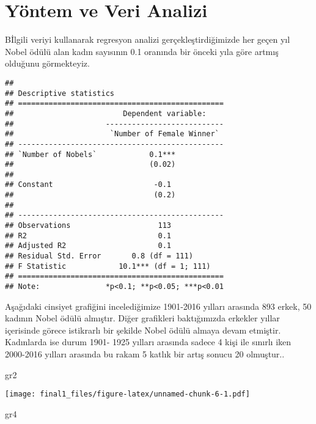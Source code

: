 \documentclass[
  12pt,
]{article}
\newenvironment{Shaded}{\begin{snugshade}}{\end{snugshade}}
\newcommand{\NormalTok}[1]{#1}
\begin{document}
\hypertarget{yuxf6ntem-ve-veri-analizi}{%
\section{Yöntem ve Veri Analizi}\label{yuxf6ntem-ve-veri-analizi}}

Bİlgili veriyi kullanarak regresyon analizi gerçekleştirdiğimizde her geçen yıl Nobel ödülü alan kadın sayısının 0.1 oranında bir önceki yıla göre artmış olduğunu görmekteyiz.

\begin{verbatim}
## 
## Descriptive statistics
## ===============================================
##                         Dependent variable:    
##                     ---------------------------
##                      `Number of Female Winner` 
## -----------------------------------------------
## `Number of Nobels`            0.1***           
##                               (0.02)           
##                                                
## Constant                       -0.1            
##                                (0.2)           
##                                                
## -----------------------------------------------
## Observations                    113            
## R2                              0.1            
## Adjusted R2                     0.1            
## Residual Std. Error       0.8 (df = 111)       
## F Statistic            10.1*** (df = 1; 111)   
## ===============================================
## Note:               *p<0.1; **p<0.05; ***p<0.01
\end{verbatim}

Aşağıdaki cinsiyet grafiğini incelediğimize 1901-2016 yılları arasında 893 erkek, 50 kadının Nobel ödülü almıştır.
Diğer grafikleri baktığımızda erkekler yıllar içerisinde görece istikrarlı bir şekilde Nobel ödülü almaya devam etmiştir. Kadınlarda ise durum 1901- 1925 yılları arasında sadece 4 kişi ile sınırlı iken 2000-2016 yılları arasında bu rakam 5 katlık bir artış sonucu 20 olmuştur..

\begin{Shaded}
\begin{Highlighting}[]
\NormalTok{gr2}
\end{Highlighting}
\end{Shaded}

\texttt{[image: final1\_files/figure-latex/unnamed-chunk-6-1.pdf]}

\begin{Shaded}
\begin{Highlighting}[]
\NormalTok{gr4}
\end{Highlighting}
\end{Shaded}
\end{document}
